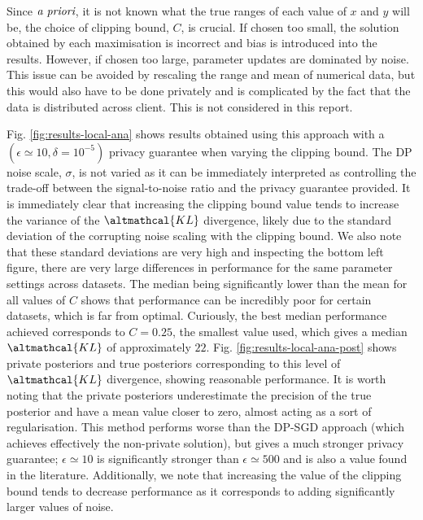 Since $\emph{a priori}$, it is not known what the true ranges of each value of $x$ and $y$ will be, the choice of clipping bound, $C$, is crucial. If chosen too small, the solution obtained by each maximisation is incorrect and bias is introduced into the results. However, if chosen too large, parameter updates are dominated by noise. This issue can be avoided by rescaling the range and mean of numerical data, but this would also have to be done privately and is complicated by the fact that the data is distributed across client. This is not considered in this report. 

Fig. \ref{fig:results-local-ana} shows results obtained using this approach with a $(\epsilon \simeq 10, \delta = 10^{-5})$ privacy guarantee when varying the clipping bound. The DP noise scale, $\sigma$, is not varied as it can be immediately interpreted as controlling the trade-off between the signal-to-noise ratio and the privacy guarantee provided. It is immediately clear that increasing the clipping bound value tends to increase the variance of the $\altmathcal{KL}$ divergence, likely due to the standard deviation of the corrupting noise scaling with the clipping bound. We also note that these standard deviations are very high and inspecting the bottom left figure, there are very large differences in performance for the same parameter settings across datasets. The median being significantly lower than the mean for all values of $C$ shows that performance can be incredibly poor for certain datasets, which is far from optimal. Curiously, the best median performance achieved corresponds to $C=0.25$, the smallest value used, which gives a median $\altmathcal{KL}$ of approximately $22$. Fig. \ref{fig:results-local-ana-post} shows private posteriors and true posteriors corresponding to this level of $\altmathcal{KL}$ divergence, showing reasonable performance. It is worth noting that the private posteriors underestimate the precision of the true posterior and have a mean value closer to zero, almost acting as a sort of regularisation. This method performs worse than the DP-SGD approach (which achieves effectively the non-private solution), but gives a much stronger privacy guarantee; $\epsilon \simeq 10$ is significantly stronger than $\epsilon \simeq 500$ and is also a value found in the literature. Additionally, we note that increasing the value of the clipping bound tends to decrease performance as it corresponds to adding significantly larger values of noise. 

